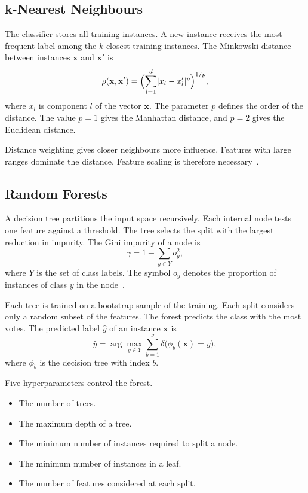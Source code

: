 \documentclass[conference]{IEEEtran}
\newcommand{\vect}[1]{\mathbf{#1}}
\begin{document}
\subsection{k-Nearest Neighbours}
\label{sub:knn}

The classifier stores all training instances.
A new instance receives the most frequent label among the $k$ closest training instances.
The Minkowski distance between instances $\vect{x}$ and $\vect{x}'$ is
\begin{equation}
\rho(\vect{x}, \vect{x}') = \Bigl( \sum_{l=1}^{d} \lvert x_l - x'_l \rvert^{p} \Bigr)^{1/p} ,
\label{eq:minkowski}
\end{equation}
where $x_l$ is component $l$ of the vector $\vect{x}$.
The parameter $p$ defines the order of the distance.
The value $p = 1$ gives the Manhattan distance, and $p = 2$ gives the Euclidean distance.

Distance weighting gives closer neighbours more influence.
Features with large ranges dominate the distance.
Feature scaling is therefore necessary~\cite{Hastie2009}.

\subsection{Random Forests}
\label{sub:rf}

A decision tree partitions the input space recursively.
Each internal node tests one feature against a threshold.
The tree selects the split with the largest reduction in impurity.
The Gini impurity of a node is
\begin{equation}
\gamma = 1 - \sum_{y \in Y} o_y^{2} ,
\label{eq:gini}
\end{equation}
where $Y$ is the set of class labels.
The symbol $o_y$ denotes the proportion of instances of class $y$ in the node~\cite{Hastie2009}.

Each tree is trained on a bootstrap sample of the training.
Each split considers only a random subset of the features.
The forest predicts the class with the most votes.
The predicted label $\hat{y}$ of an instance $\vect{x}$ is
\begin{equation}
\hat{y} = \arg\max_{y \in Y} \sum_{b=1}^{\nu} \delta\bigl( \phi_b(\vect{x}) = y \bigr) ,
\label{eq:forest}
\end{equation}
where $\phi_b$ is the decision tree with index $b$.

Five hyperparameters control the forest.

\begin{itemize}
    \item The number of trees.
    \item The maximum depth of a tree.
    \item The minimum number of instances required to split a node.
    \item The minimum number of instances in a leaf.
    \item The number of features considered at each split.
\end{itemize}
\end{document}
